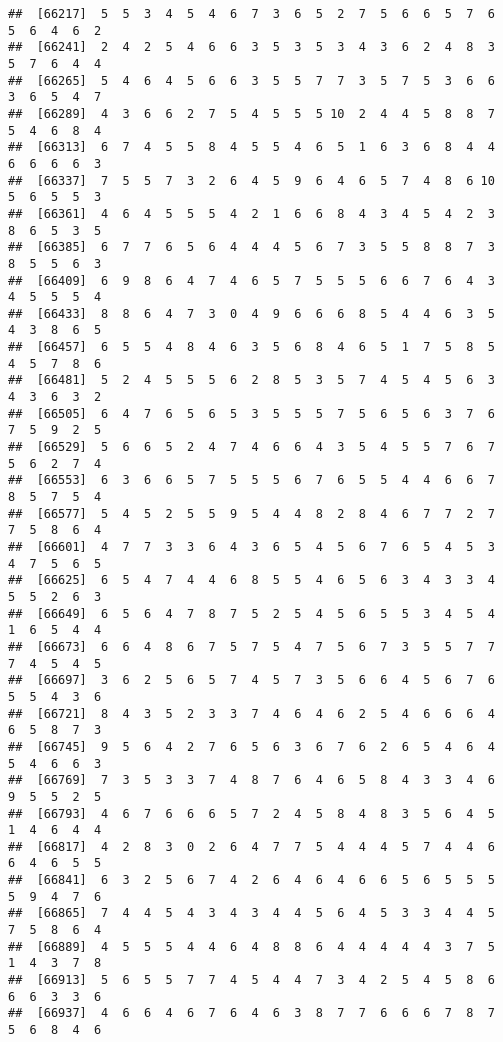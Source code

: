 \documentclass[
]{book}
\begin{document}
\begin{verbatim}
##  [66217]  5  5  3  4  5  4  6  7  3  6  5  2  7  5  6  6  5  7  6  5  6  4  6  2
##  [66241]  2  4  2  5  4  6  6  3  5  3  5  3  4  3  6  2  4  8  3  5  7  6  4  4
##  [66265]  5  4  6  4  5  6  6  3  5  5  7  7  3  5  7  5  3  6  6  3  6  5  4  7
##  [66289]  4  3  6  6  2  7  5  4  5  5  5 10  2  4  4  5  8  8  7  5  4  6  8  4
##  [66313]  6  7  4  5  5  8  4  5  5  4  6  5  1  6  3  6  8  4  4  6  6  6  6  3
##  [66337]  7  5  5  7  3  2  6  4  5  9  6  4  6  5  7  4  8  6 10  5  6  5  5  3
##  [66361]  4  6  4  5  5  5  4  2  1  6  6  8  4  3  4  5  4  2  3  8  6  5  3  5
##  [66385]  6  7  7  6  5  6  4  4  4  5  6  7  3  5  5  8  8  7  3  8  5  5  6  3
##  [66409]  6  9  8  6  4  7  4  6  5  7  5  5  5  6  6  7  6  4  3  4  5  5  5  4
##  [66433]  8  8  6  4  7  3  0  4  9  6  6  6  8  5  4  4  6  3  5  4  3  8  6  5
##  [66457]  6  5  5  4  8  4  6  3  5  6  8  4  6  5  1  7  5  8  5  4  5  7  8  6
##  [66481]  5  2  4  5  5  5  6  2  8  5  3  5  7  4  5  4  5  6  3  4  3  6  3  2
##  [66505]  6  4  7  6  5  6  5  3  5  5  5  7  5  6  5  6  3  7  6  7  5  9  2  5
##  [66529]  5  6  6  5  2  4  7  4  6  6  4  3  5  4  5  5  7  6  7  5  6  2  7  4
##  [66553]  6  3  6  6  5  7  5  5  5  6  7  6  5  5  4  4  6  6  7  8  5  7  5  4
##  [66577]  5  4  5  2  5  5  9  5  4  4  8  2  8  4  6  7  7  2  7  7  5  8  6  4
##  [66601]  4  7  7  3  3  6  4  3  6  5  4  5  6  7  6  5  4  5  3  4  7  5  6  5
##  [66625]  6  5  4  7  4  4  6  8  5  5  4  6  5  6  3  4  3  3  4  5  5  2  6  3
##  [66649]  6  5  6  4  7  8  7  5  2  5  4  5  6  5  5  3  4  5  4  1  6  5  4  4
##  [66673]  6  6  4  8  6  7  5  7  5  4  7  5  6  7  3  5  5  7  7  7  4  5  4  5
##  [66697]  3  6  2  5  6  5  7  4  5  7  3  5  6  6  4  5  6  7  6  5  5  4  3  6
##  [66721]  8  4  3  5  2  3  3  7  4  6  4  6  2  5  4  6  6  6  4  6  5  8  7  3
##  [66745]  9  5  6  4  2  7  6  5  6  3  6  7  6  2  6  5  4  6  4  5  4  6  6  3
##  [66769]  7  3  5  3  3  7  4  8  7  6  4  6  5  8  4  3  3  4  6  9  5  5  2  5
##  [66793]  4  6  7  6  6  6  5  7  2  4  5  8  4  8  3  5  6  4  5  1  4  6  4  4
##  [66817]  4  2  8  3  0  2  6  4  7  7  5  4  4  4  5  7  4  4  6  6  4  6  5  5
##  [66841]  6  3  2  5  6  7  4  2  6  4  6  4  6  6  5  6  5  5  5  5  9  4  7  6
##  [66865]  7  4  4  5  4  3  4  3  4  4  5  6  4  5  3  3  4  4  5  7  5  8  6  4
##  [66889]  4  5  5  5  4  4  6  4  8  8  6  4  4  4  4  4  3  7  5  1  4  3  7  8
##  [66913]  5  6  5  5  7  7  4  5  4  4  7  3  4  2  5  4  5  8  6  6  6  3  3  6
##  [66937]  4  6  6  4  6  7  6  4  6  3  8  7  7  6  6  6  7  8  7  5  6  8  4  6

\end{verbatim}
\end{document}
